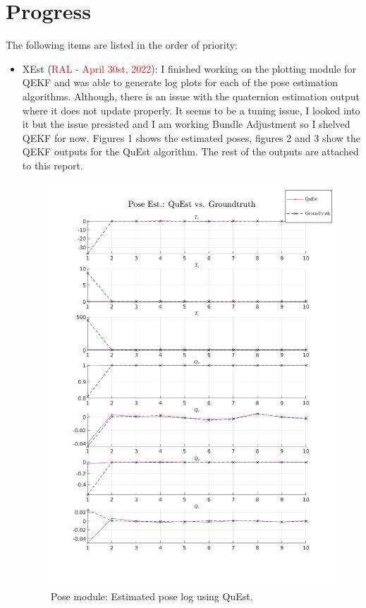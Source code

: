 \documentclass[11pt]{article}
\begin{document}
\section{Progress}
The following items are listed in the order of priority:
\begin{itemize}
    \item XEst (\textcolor{red}{RAL - April 30st, 2022}): I finished working on
    the plotting module for QEKF and was able to generate log plots for each of
    the pose estimation algorithms. Although, there is an issue with the
    quaternion estimation output where it does not update properly. It seems to
    be a tuning issue, I looked into it but the issue presisted and I am working
    Bundle Adjustment so I shelved QEKF for now. Figures 1 shows the estimated
    poses, figures 2 and 3 show the QEKF outputs for the QuEst algorithm. The
    rest of the outputs are attached to this report.

    \begin{figure}[H]
      \begin{center}
        \includegraphics[width=\linewidth]{plt_pos_log_QuEst.png}
      \end{center}
      \caption{Pose module: Estimated pose log using QuEst.}
    \end{figure}


\end{itemize}
\end{document}
